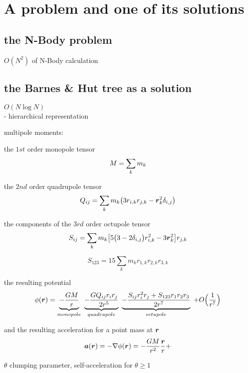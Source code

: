 
\section{A problem and one of its solutions}

\subsection{the N-Body problem}

$O(N^2)$ of N-Body calculation

\subsection{the Barnes \& Hut tree as a solution}

$O( N \log N )$\\
- hierarchical representation

multipole moments:

the $1st$ order monopole tensor
\begin{equation}
M = \sum_{k} m_k \\
\end{equation}

the $2nd$ order quadrupole tensor
\begin{equation}
Q_{ij} = \sum_{k} m_k \big( 3 r_{i,k} r_{j,k} - \boldsymbol{r}_{k}^2 \delta_{i,j} \big) \\
\end{equation}

the components of the $3rd$ order octupole tensor
\begin{equation}
S_{ij}  = \sum_{k} m_k \big[ 5 \big( 3 - 2  \delta_{i,j} \big) r_{i, k}^2 - 3 \boldsymbol{r}_{k}^2 \big] r_{j,k}\\
\end{equation}

\begin{equation}
S_{1 2 3} = 15 \sum_{k} m_k r_{1, k} r_{2, k} r_{3, k}
\end{equation}

the resulting potential
\begin{equation}
\phi(\boldsymbol{r}) = 
\underbrace{ - \frac{G M}{r} }_{monopole} ~ 
\underbrace{ - \frac{G Q_{ij} r_{i} r_{j} }{2 r^5} }_{quadrupole}~ 
\underbrace{ - \frac{S_{ij} r_{i}^2 r_{j} + S_{1 2 3} r_{1} r_{2} r_{3} }{2 r^{7}} }_{octupole}~ 
+ O\Big(\frac{1}{r^{7}}\Big)
\end{equation}

and the resulting acceleration for a point mass at $\boldsymbol{r}$
\begin{equation}
\boldsymbol{a}(\boldsymbol{r}) = - \nabla \phi(\boldsymbol{r}) = - \frac{G M}{r^2} \frac{\boldsymbol{r}}{r} + 
\end{equation}

$\theta$ clumping parameter, self-acceleration for $\theta \ge 1$
\cite{1986Natur.324..446B}